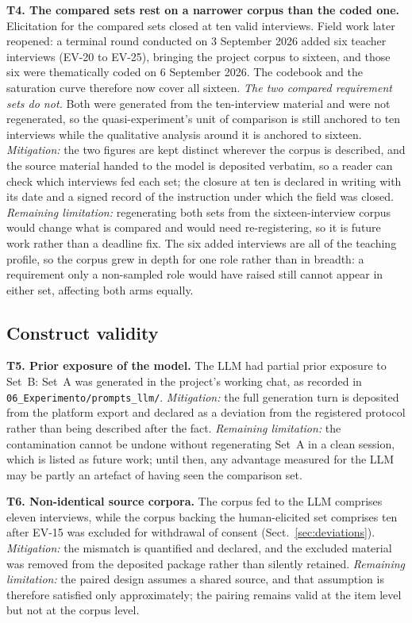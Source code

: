 \documentclass{llncs}
\begin{document}
\textbf{T4. The compared sets rest on a narrower corpus than the coded one.} Elicitation
for the compared sets closed at ten valid interviews. Field work later reopened: a
terminal round conducted on 3 September 2026 added six teacher interviews (EV-20 to
EV-25), bringing the project corpus to sixteen, and those six were thematically coded on
6 September 2026. The codebook and the saturation curve therefore now cover all sixteen.
\emph{The two compared requirement sets do not.} Both were generated from the ten-interview
material and were not regenerated, so the quasi-experiment's unit of comparison is still
anchored to ten interviews while the qualitative analysis around it is anchored to sixteen.
\emph{Mitigation:} the two figures are kept distinct wherever the corpus is described, and
the source material handed to the model is deposited verbatim, so a reader can check which
interviews fed each set; the closure at ten is declared in writing with its date and a
signed record of the instruction under which the field was closed.
\emph{Remaining limitation:} regenerating both sets from the sixteen-interview corpus
would change what is compared and would need re-registering, so it is future work rather
than a deadline fix. The six added interviews are all of the teaching profile, so the
corpus grew in depth for one role rather than in breadth: a requirement only a non-sampled
role would have raised still cannot appear in either set, affecting both arms equally.

\subsection{Construct validity}

\textbf{T5. Prior exposure of the model.} The LLM had partial prior exposure to
Set~B: Set~A was generated in the project's working chat, as recorded in
\nolinkurl{06_Experimento/prompts_llm/}.
\emph{Mitigation:} the full generation turn is deposited from the platform export and
declared as a deviation from the registered protocol rather than being described
after the fact. \emph{Remaining limitation:} the contamination cannot be undone
without regenerating Set~A in a clean session, which is listed as future work;
until then, any advantage measured for the LLM may be partly an artefact of
having seen the comparison set.

\textbf{T6. Non-identical source corpora.} The corpus fed to the LLM comprises
eleven interviews, while the corpus backing the human-elicited set comprises ten
after EV-15 was excluded for withdrawal of consent (Sect.~\ref{sec:deviations}).
\emph{Mitigation:} the mismatch is quantified and declared, and the excluded
material was removed from the deposited package rather than silently retained.
\emph{Remaining limitation:} the paired design assumes a shared source, and that
assumption is therefore satisfied only approximately; the pairing remains valid
at the item level but not at the corpus level.
\end{document}
